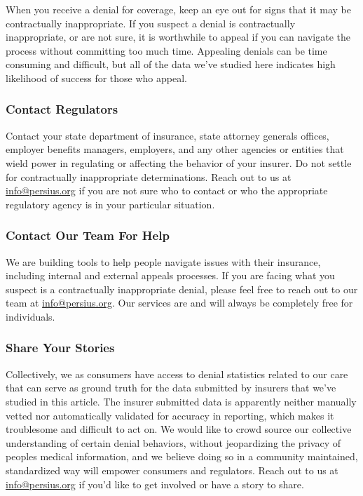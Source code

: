 \documentclass[12pt, a4paper,twoside]{report}
\theoremstyle{plain} %
\theoremstyle{definition} %
\theoremstyle{remark} %
\numberwithin{equation}{chapter}
\begin{document}
		When you receive a denial for coverage, keep an eye out for signs that it may be contractually inappropriate. If you suspect a denial is contractually inappropriate, or are not sure, it is worthwhile to appeal if you can navigate the process without committing too much time. Appealing denials can be time consuming and difficult, but all of the data we've studied here indicates high likelihood of success for those who appeal.
		
		\subsubsection{Contact Regulators}
		
		Contact your state department of insurance, state attorney generals offices, employer benefits managers, employers, and any other agencies or entities that wield power in regulating or affecting the behavior of your insurer. Do not settle for contractually inappropriate determinations. Reach out to us at \href{info@persius.org}{info@persius.org} if you are not sure who to contact or who the appropriate regulatory agency is in your particular situation.
		
		\subsubsection{Contact Our Team For Help}
		
		We are building tools to help people navigate issues with their insurance, including internal and external appeals processes. If you are facing what you suspect is a contractually inappropriate denial, please feel free to reach out to our team at \href{info@persius.org}{info@persius.org}. Our services are and will always be completely free for individuals.
		
		\subsubsection{Share Your Stories}
		
		Collectively, we as consumers have access to denial statistics related to our care that can serve as ground truth for the data submitted by insurers that we've studied in this article. The insurer submitted data is apparently neither manually vetted nor automatically validated for accuracy in reporting, which makes it troublesome and difficult to act on. We would like to crowd source our collective understanding of certain denial behaviors, without jeopardizing the privacy of peoples medical information, and we believe doing so in a community maintained, standardized way will empower consumers and regulators. Reach out to us at \href{info@persius.org}{info@persius.org} if you'd like to get involved or have a story to share.
		
\end{document}
